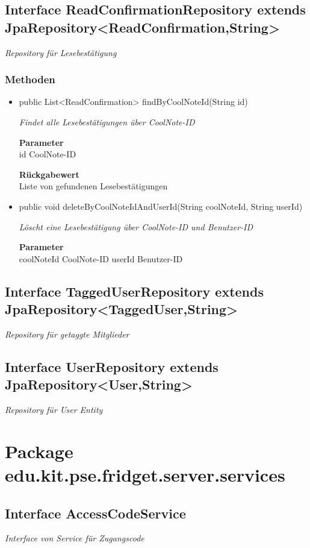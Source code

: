 \documentclass[a4paper]{scrreprt}
\begin{document}
    \subsection{Interface ReadConfirmationRepository extends JpaRepository<ReadConfirmation,String>}
    \textit{Repository für Lesebestätigung}
    \subsubsection{Methoden}
    \begin{itemize}
    	\item{public List<ReadConfirmation> findByCoolNoteId(String id)}
    	
    	\textit{Findet alle Lesebestätigungen über CoolNote-ID}
    	
    	\textbf{Parameter} \\
    	id CoolNote-ID
    	
    	\textbf{Rückgabewert} \\
    	Liste von gefundenen Lesebestätigungen        \item{public void deleteByCoolNoteIdAndUserId(String coolNoteId, String userId)}
    	
    	\textit{Löscht eine Lesebestätigung über CoolNote-ID und Benutzer-ID}
    	
    	\textbf{Parameter} \\
    	coolNoteId CoolNote-ID
    	userId Benutzer-ID
    	
    	
    \end{itemize}
    \subsection{Interface TaggedUserRepository extends JpaRepository<TaggedUser,String>}
    \textit{Repository für getaggte Mitglieder}
    \subsection{Interface UserRepository extends JpaRepository<User,String>}
    \textit{Repository für User Entity}
    \section{Package edu.kit.pse.fridget.server.services}
    \subsection{Interface AccessCodeService}
    \textit{Interface von Service für Zugangscode}
\end{document}
